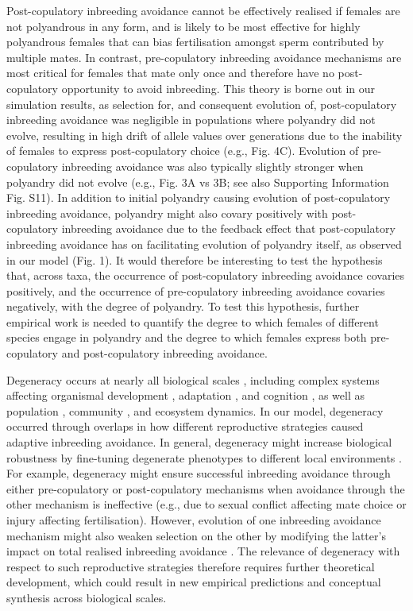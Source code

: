 \documentclass[12pt]{article}
\begin{document}
Post-copulatory inbreeding avoidance cannot be effectively realised if females are not polyandrous in any form, and is likely to be most effective for highly polyandrous females that can bias fertilisation amongst sperm contributed by multiple mates. In contrast, pre-copulatory inbreeding avoidance mechanisms are most critical for females that mate only once and therefore have no post-copulatory opportunity to avoid inbreeding. This theory is borne out in our simulation results, as selection for, and consequent evolution of, post-copulatory inbreeding avoidance was negligible in populations where polyandry did not evolve, resulting in high drift of allele values over generations due to the inability of females to express post-copulatory choice (e.g., Fig. 4C). Evolution of pre-copulatory inbreeding avoidance was also typically slightly stronger when polyandry did not evolve (e.g., Fig. 3A vs 3B; see also Supporting Information Fig. S11). In addition to initial polyandry causing evolution of post-copulatory inbreeding avoidance, polyandry might also covary positively with post-copulatory inbreeding avoidance due to the feedback effect that post-copulatory inbreeding avoidance has on facilitating evolution of polyandry itself, as observed in our model (Fig. 1). It would therefore be interesting to test the hypothesis that, across taxa, the occurrence of post-copulatory inbreeding avoidance covaries positively, and the occurrence of pre-copulatory inbreeding avoidance covaries negatively, with the degree of polyandry. To test this hypothesis, further empirical work is needed to quantify the degree to which females of different species engage in polyandry and the degree to which females express both pre-copulatory and post-copulatory inbreeding avoidance.

Degeneracy occurs at nearly all biological scales \cite[][]{Edelman2001}, including complex systems affecting organismal development \cite[e.g.,][]{Nowak1997}, adaptation \cite[][]{Whitacre2010, Whitacre2010a}, and cognition \cite[][]{Price2002, Park2013}, as well as population \cite[][]{Atamas2009}, community \cite[][]{Suraci2017}, and ecosystem \cite[e.g.,][]{Levin2008} dynamics. In our model, degeneracy occurred through overlaps in how different reproductive strategies caused adaptive inbreeding avoidance. In general, degeneracy might increase biological robustness by fine-tuning degenerate phenotypes to different local environments \cite[][]{Gardner2006, Whitacre2010a}. For example, degeneracy might ensure successful inbreeding avoidance through either pre-copulatory or post-copulatory mechanisms when avoidance through the other mechanism is ineffective (e.g., due to sexual conflict affecting mate choice or injury affecting fertilisation). However, evolution of one inbreeding avoidance mechanism might also weaken selection on the other by modifying the latter's impact on total realised inbreeding avoidance \cite[\textit{sensu} evolution of genetic redundancy; see][]{Nowak1997}. The relevance of degeneracy with respect to such reproductive strategies therefore requires further theoretical development, which could result in new empirical predictions and conceptual synthesis across biological scales. 
\end{document}
